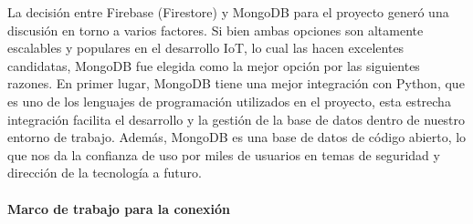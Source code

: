 %
La decisión entre Firebase (Firestore) y MongoDB para el proyecto generó una discusión en torno a varios factores. Si bien ambas opciones son altamente escalables y populares en el desarrollo IoT, lo cual las hacen excelentes candidatas, MongoDB fue elegida como la mejor opción por las siguientes razones. En primer lugar, MongoDB tiene una mejor integración con Python, que es uno de los lenguajes de programación utilizados en el proyecto, esta estrecha integración facilita el desarrollo y la gestión de la base de datos dentro de nuestro entorno de trabajo. Además, MongoDB es una base de datos de código abierto, lo que nos da la confianza de uso por miles de usuarios en temas de seguridad y dirección de la tecnología a futuro. \\

\paragraph{Marco de trabajo para la conexión}

